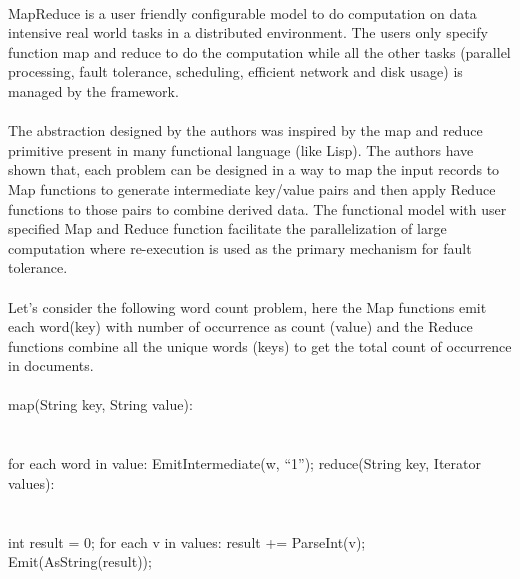 \documentclass[8pt]{extarticle}
\begin{document}
\paragraph{}
MapReduce is a user friendly configurable model to do computation on data intensive real world tasks in a distributed environment. The users only specify function map and reduce to do the computation while all the other tasks (parallel processing, fault tolerance, scheduling, efficient network and disk usage) is managed by the framework.

\paragraph{}
The abstraction designed by the authors was inspired by the map and reduce primitive present in many functional language (like Lisp). The authors have shown that, each problem can be designed in a way to map the input records to Map functions to generate intermediate key/value pairs and then apply Reduce functions to those pairs to combine derived data. The functional model with user specified Map and Reduce function facilitate the parallelization of large computation where re-execution is used as the primary mechanism for fault tolerance.

\paragraph{}
Let's consider the following word count problem, here the Map functions emit each word(key) with number of occurrence as count (value) and the Reduce functions combine all the unique words (keys) to get the total count of occurrence in documents.

\paragraph{}
\begin{algorithm}
\begin{algorithmic}
	\STATE map(String key, String value):\\
	\\
	\\
	\STATE for each word in value:
	\STATE EmitIntermediate(w, “1”);
	\STATE reduce(String key, Iterator values):\\
	\\
	\\
	\STATE int result = 0;
	\STATE for each v in values:
	\STATE result += ParseInt(v);
	\STATE Emit(AsString(result));
\end{algorithmic}		
\end{algorithm}
\end{document}
